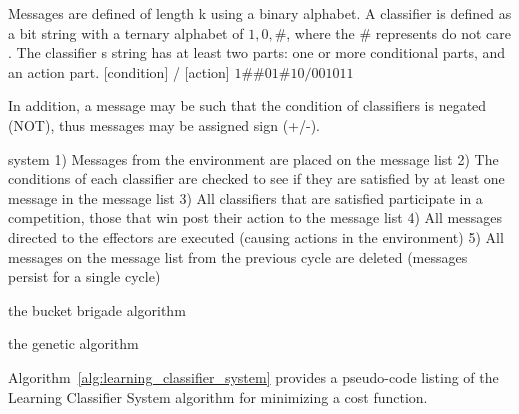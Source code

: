 \documentclass[a4paper, 11pt]{article}
\begin{document}
Messages are defined of length k using a binary alphabet. A classifier is defined as a bit string with a ternary alphabet of ${1, 0, \#}$, where the $\#$ represents do not care . The classifier s string has at least two parts: one or more conditional parts, and an action part. 
[condition] / [action] $1\#\#01\#10/001011$

In addition, a message may be such that the condition of classifiers is negated (NOT), thus messages may be assigned sign (+/-).

system
1) Messages from the environment are placed on the message list 2) The conditions of each classifier are checked to see if they are satisfied by at least one message in the message list 3) All classifiers that are satisfied participate in a competition, those that win post their action to the message list 4) All messages directed to the effectors are executed (causing actions in the environment) 5) All messages on the message list from the previous cycle are deleted (messages persist for a single cycle)

the bucket brigade algorithm

the genetic algorithm

Algorithm~\ref{alg:learning_classifier_system} provides a pseudo-code listing of the Learning Classifier System algorithm for minimizing a cost function. 
\end{document}
